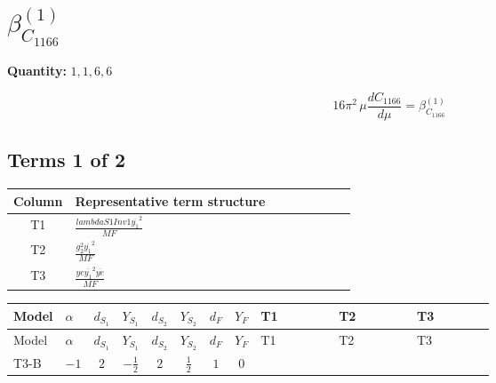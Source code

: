 \documentclass[8pt]{article}
\begin{document}
\begin{landscape}
\begin{longtable}{@{}llcccccc >{\raggedright\arraybackslash}p{0.21\linewidth} >{\raggedright\arraybackslash}p{0.21\linewidth} >{\raggedright\arraybackslash}p{0.21\linewidth}@{}}
\midrule
\bottomrule
\end{longtable}
\clearpage
\section*{$\beta_{C_{1166}}^{(1)}$}
\noindent\textbf{Quantity: }$\mathrm{1,1,6,6}$\par\smallskip
\[16\pi^2\,\mu\frac{d C_{1166}}{d\mu}=\beta_{C_{1166}}^{(1)}\]
\subsection*{Terms 1 of 2}
\begin{center}
\begin{tabular}{@{}c >{\raggedright\arraybackslash}p{0.82\linewidth}@{}}
\toprule
Column & Representative term structure \\
\midrule
T1 & \(\displaystyle \frac{lambdaS1Inv1 \overline{y_{1}}^{2}}{MF}\) \\
\midrule
T2 & \(\displaystyle \frac{g_{2}^{2} \overline{y_{1}}^{2}}{MF}\) \\
\midrule
T3 & \(\displaystyle \frac{ye \overline{y_{1}}^{2} \overline{ye}}{MF}\) \\
\midrule
\bottomrule
\end{tabular}
\end{center}
\smallskip
\tiny
\begin{longtable}{@{}llcccccc >{\raggedright\arraybackslash}p{0.21\linewidth} >{\raggedright\arraybackslash}p{0.21\linewidth} >{\raggedright\arraybackslash}p{0.21\linewidth}@{}}
\toprule
Model & $\alpha$ & $d_{S_1}$ & $Y_{S_1}$ & $d_{S_2}$ & $Y_{S_2}$ & $d_F$ & $Y_F$ & T1 & T2 & T3 \\
\midrule
\endfirsthead
\toprule
Model & $\alpha$ & $d_{S_1}$ & $Y_{S_1}$ & $d_{S_2}$ & $Y_{S_2}$ & $d_F$ & $Y_F$ & T1 & T2 & T3 \\
\midrule
\endhead
T3-B & $-1$ & $2$ & $-\frac{1}{2}$ & $2$ & $\frac{1}{2}$ & $1$ & $0$ & \scriptsize\adjustbox{max width=\linewidth}{$\begin{gathered} \frac{lambdaS1Inv1 \overline{y_{1}}^{2}}{2 MF}\end{gathered}$} & \scriptsize\adjustbox{max width=\linewidth}{$\begin{gathered} \frac{3 g_{2}^{2} \overline{y_{1}}^{2}}{4 MF}\end{gathered}$} & \scriptsize\adjustbox{max width=\linewidth}{$\begin{gathered} - \frac{ye \overline{y_{1}}^{2} \overline{ye}}{4 MF}\end{gathered}$} \\

\end{longtable}
\end{landscape}
\end{document}
